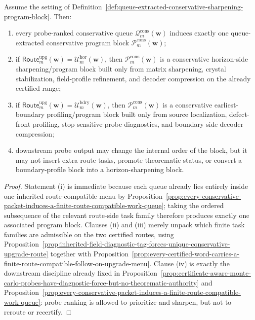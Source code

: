 \begin{proposition}
\label{prop:every-probe-ranked-conservative-queue-induces-one-route-faithful-working-program-block}
Assume the setting of Definition~\ref{def:queue-extracted-conservative-sharpening-program-block}. Then:
\begin{enumerate}[label=(\roman*)]
 \item every probe-ranked conservative queue \(\mathcal Q^{\mathrm{cons}}_{m}(\mathbf w)\) induces exactly one queue-extracted conservative program block \(\mathcal P^{\mathrm{cons}}_{m}(\mathbf w)\);
 \item if \(\mathsf{Route}^{\mathrm{upg}}_{m}(\mathbf w)=\mathcal U^{\mathrm{hor}}_{m}(\mathbf w)\), then \(\mathcal P^{\mathrm{cons}}_{m}(\mathbf w)\) is a conservative horizon-side sharpening/program block built only from matrix sharpening, crystal stabilization, field-profile refinement, and decoder compression on the already certified range;
 \item if \(\mathsf{Route}^{\mathrm{upg}}_{m}(\mathbf w)=\mathcal U^{\mathrm{bdry}}_{m}(\mathbf w)\), then \(\mathcal P^{\mathrm{cons}}_{m}(\mathbf w)\) is a conservative earliest-boundary profiling/program block built only from source localization, defect-front profiling, stop-sensitive probe diagnostics, and boundary-side decoder compression;
 \item downstream probe output may change the internal order of the block, but it may not insert extra-route tasks, promote theorematic status, or convert a boundary-profile block into a horizon-sharpening block.
\end{enumerate}
\end{proposition}

\begin{proof}
Statement (i) is immediate because each queue already lies entirely inside one inherited route-compatible menu by Proposition~\ref{prop:every-conservative-packet-induces-a-finite-route-compatible-work-queue}; taking the ordered subsequence of the relevant route-side task family therefore produces exactly one associated program block. Clauses (ii) and (iii) merely unpack which finite task families are admissible on the two certified routes, using Proposition~\ref{prop:inherited-field-diagnostic-tag-forces-unique-conservative-upgrade-route} together with Proposition~\ref{prop:every-certified-word-carries-a-finite-route-compatible-follow-on-upgrade-menu}. Clause (iv) is exactly the downstream discipline already fixed in Proposition~\ref{prop:certificate-aware-monte-carlo-probes-have-diagnostic-force-but-no-theorematic-authority} and Proposition~\ref{prop:every-conservative-packet-induces-a-finite-route-compatible-work-queue}: probe ranking is allowed to prioritize and sharpen, but not to reroute or recertify.
\end{proof}

